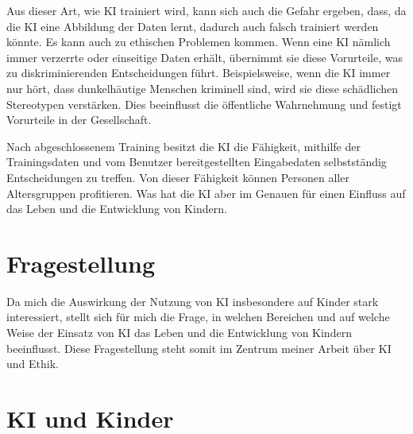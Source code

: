 \documentclass{article}
\begin{document}
Aus dieser Art, wie KI trainiert wird, kann sich auch die Gefahr ergeben, dass, da die KI eine Abbildung der Daten lernt, dadurch auch falsch trainiert werden könnte. Es kann auch zu ethischen Problemen kommen.
Wenn eine KI nämlich immer verzerrte oder einseitige Daten erhält, übernimmt sie diese Vorurteile, was zu diskriminierenden Entscheidungen führt. Beispielsweise, wenn die KI immer nur hört, dass dunkelhäutige Menschen kriminell sind, wird sie diese schädlichen Stereotypen verstärken. Dies beeinflusst die öffentliche Wahrnehmung und festigt Vorurteile in der Gesellschaft.

Nach abgeschlossenem Training besitzt die KI die Fähigkeit, mithilfe der Trainingsdaten und vom Benutzer bereitgestellten Eingabedaten selbstständig Entscheidungen zu treffen. Von dieser Fähigkeit können Personen aller Altersgruppen profitieren. Was hat die KI aber im Genauen für einen Einfluss auf das Leben und die Entwicklung von Kindern.

\section{Fragestellung}

Da mich die Auswirkung der Nutzung von KI insbesondere auf Kinder stark interessiert, stellt sich für mich die Frage, in welchen Bereichen und auf welche Weise der Einsatz von KI das Leben und die Entwicklung von Kindern beeinflusst. Diese Fragestellung steht somit im Zentrum meiner Arbeit über KI und Ethik.

\section{KI und Kinder}
\end{document}
